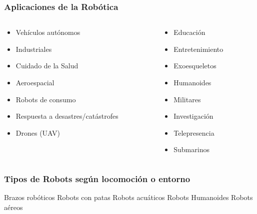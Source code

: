 \begin{frame}
    \frametitle{Aplicaciones de la Robótica}

    \begin{columns}[T] %
        \begin{column}{.48\textwidth}
            \begin{itemize}
                \item Vehículos autónomos
                \item Industriales 
                \item Cuidado de la Salud
                \item Aeroespacial
                \item Robots de consumo
                \item Respuesta a desastres/catástrofes
                \item Drones (UAV)
            \end{itemize}
        \end{column}%
        \hfill%
        \begin{column}{.48\textwidth}
            \begin{itemize}
                \item Educación
                \item Entretenimiento
                \item Exoesqueletos
                \item Humanoides
                \item Militares
                \item Investigación
                \item Telepresencia
                \item Submarinos
            \end{itemize}
        \end{column}%
    \end{columns}

\end{frame}

\begin{frame}
    \frametitle{Tipos de Robots según locomoción o entorno}
    
    Brazos robóticos
    Robots con patas
    Robots acuáticos
    Robots Humanoides
    Robots aéreos
    
\end{frame}


